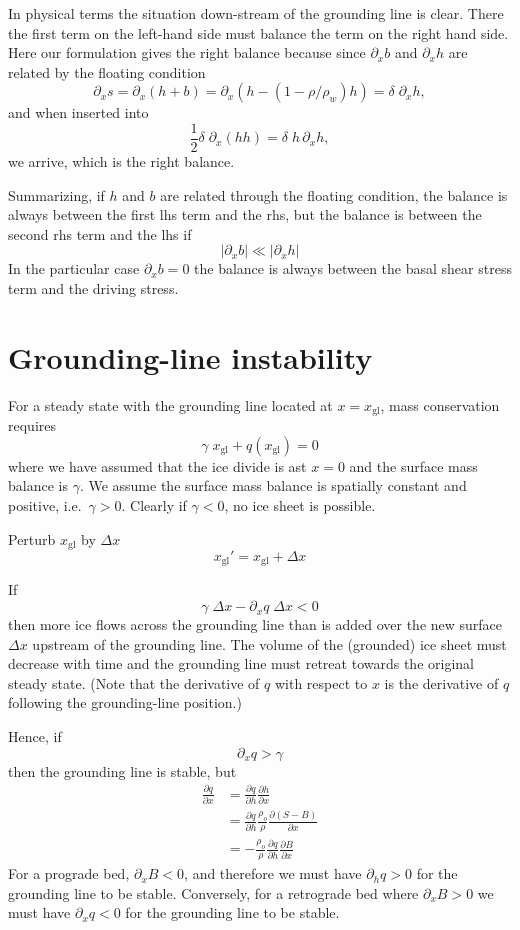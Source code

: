 \documentclass[10pt,a4paper]{book}
\newcommand{\p}{\partial}
\newcommand{\xgl}{x_{\mathrm{gl}}}
\begin{document}
In physical terms the situation down-stream of the grounding line is clear. There the
first term on the left-hand side must balance the term on the right
hand side. Here our formulation gives the right balance because since  $\p_x
b$ and $\p_x h$ are related by the floating condition
\[
\p_x s= \p_x(h+b)=\p_x (h-(1-\rho/\rho_w) h)=\delta \; \p_x h ,
\]
and when inserted into 
\begin{equation}
 \frac{1}{2} \delta \; \p_x \left (h h \right )  = \delta \; h \, \p_x h  ,
\label{eq:sc40}
\end{equation}
we arrive, which is the right balance.

Summarizing, if $h$ and $b$ are related
through the floating condition, the balance is always between the
first lhs term and the rhs, but  the balance is between the second rhs
term and the lhs if
\[
|\p_x b| \ll |\p_x h|
\] 
In the particular case $\p_x b=0$ the balance is always
between the basal shear stress term and the driving stress.


\section{Grounding-line instability}

For a steady state with the grounding line located at $x=\xgl$, mass
conservation requires
\[
\gamma \; \xgl + q(\xgl)=0
\]
where we have assumed that the ice divide is ast $x=0$ and the surface
mass balance is $\gamma$. We assume the surface mass balance is spatially constant and
positive, i.e.\ $\gamma > 0$. Clearly if $\gamma<0$, no ice sheet is possible. 

Perturb $\xgl$ by $\Delta x$
\[
  \xgl'=\xgl + \Delta x
\]

If
\[
\gamma \; \Delta x - \p_x q \; \Delta x < 0
\]
then more ice flows across the grounding line than is added over the
new surface $\Delta x$ upstream of the grounding line. The volume of
the (grounded) ice sheet must decrease with time and the grounding
line must retreat towards the original steady state. (Note that the
derivative of $q$ with respect to $x$ is the derivative of $q$
following the grounding-line position.)


Hence, if
\[
  \p_x q > \gamma
\]
then the grounding line is stable, but
\begin{align*}
  \frac{\p q}{\p x} &= \frac{\p q}{\p h} \frac{\p h}{\p x} \\
  &= \frac{\p q}{\p h} \frac{\rho_o}{\rho} \frac{\p (S-B)}{\p x}\\
  &= -  \frac{\rho_o}{\rho}\frac{\p q}{\p h} \frac{\p B}{\p x}
\end{align*}
For a prograde bed, $\p_x B <0$, and therefore we must have $\p_h q >0$
for the grounding line to be stable. Conversely, for a retrograde bed where $\p_x
B > 0$ we must have $\p_x q <0$ for the grounding line to be stable.
\end{document}
